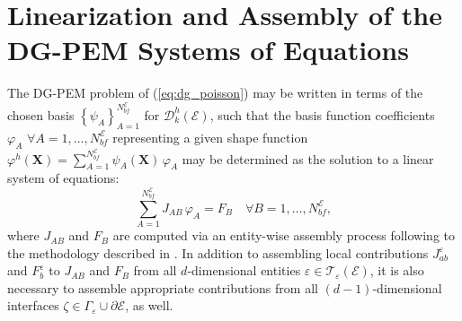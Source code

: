 \section{Linearization and Assembly of the \\ DG-PEM Systems of Equations}

	The DG-PEM problem of (\ref{eq:dg_poisson}) may be written in terms of the chosen basis $\left\{ \psi_A \right\}_{A=1}^{N^\mathcal{E}_{bf}}$ for $\mathcal{D}^h_k (\mathcal{E})$, such that the basis function coefficients $\varphi_A \, \, \forall A = 1, \ldots, N^\mathcal{E}_{bf}$ representing a given shape function $\varphi^h (\mathbf{X}) = \sum_{A=1}^{N^\mathcal{E}_{bf}} \psi_A (\mathbf{X}) \, \varphi_A$ may be determined as the solution to a linear system of equations:
	\begin{equation}
		\sum_{A=1}^{N^\mathcal{E}_{bf}} J_{AB} \, \varphi_A = F_B \quad \forall B = 1, \ldots, N^\mathcal{E}_{bf},
		\label{eq:linearization_dgpem}
	\end{equation}
	where $J_{AB}$ and $F_B$ are computed via an entity-wise assembly process following to the methodology described in \cite{Riviere:08}. In addition to assembling local contributions $J^\varepsilon_{ab}$ and $F^\varepsilon_b$ to $J_{AB}$ and $F_B$ from all $d$-dimensional entities $\varepsilon \in \mathcal{T}_\varepsilon (\mathcal{E})$, it is also necessary to assemble appropriate contributions from all $(d-1)$-dimensional interfaces $\zeta \in \Gamma_\varepsilon \cup \partial \mathcal{E}$, as well.


